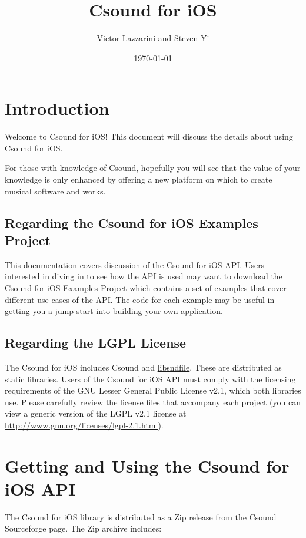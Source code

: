 \documentclass[11pt]{article}
\author{Victor Lazzarini and Steven Yi }
\date{\today}
\title{Csound for iOS}
\begin{document}
\maketitle

\section{Introduction}

Welcome to Csound for iOS! This document will discuss the details about using Csound for iOS.  

For those with knowledge of Csound, hopefully you will see that the value of your knowledge is only enhanced by offering a new platform on which to create musical software and works. 

\subsection{Regarding the Csound for iOS Examples Project}

This documentation covers discussion of the Csound for iOS API.  Users interested in diving in to see how the API is used may want to download the Csound for iOS Examples Project which contains a set of examples that cover different use cases of the API. The code for each example may be useful in getting you a jump-start into building your own application.

\subsection{Regarding the LGPL License}

The Csound for iOS includes Csound and \href{http://mega-nerd.com/libsndfile/}{libsndfile}. These are distributed as static libraries. Users of the Csound for iOS API must comply with the licensing requirements of the GNU Lesser General Public License v2.1, which both libraries use. Please carefully review the license files that accompany each project (you can view a generic version of the LGPL v2.1 license at \href{http://www.gnu.org/licenses/lgpl-2.1.html}{http://www.gnu.org/licenses/lgpl-2.1.html}). 


\section{Getting and Using the Csound for iOS API}

The Csound for iOS library is distributed as a Zip release from the Csound Sourceforge page. The Zip archive includes:
\end{document}
